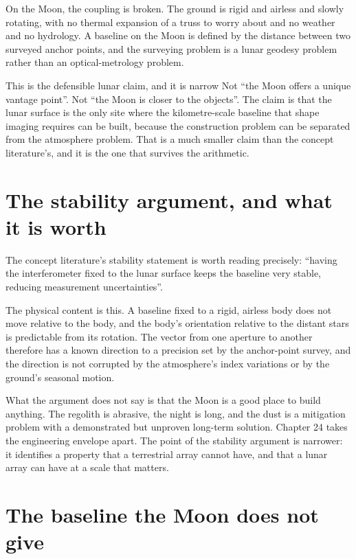 On the Moon, the coupling is broken. The ground is rigid and airless and
slowly rotating, with no thermal expansion of a truss to worry about and no
weather and no hydrology. A baseline on the Moon is defined by the distance
between two surveyed anchor points, and the surveying problem is a lunar
geodesy problem rather than an optical-metrology problem.

\begin{seamnote}{This is the defensible lunar claim, and it is narrow}
Not ``the Moon offers a unique vantage point''. Not ``the Moon is closer to
the objects''. The claim is that the lunar surface is the only site where
the kilometre-scale baseline that shape imaging requires can be built,
because the construction problem can be separated from the atmosphere
problem. That is a much smaller claim than the concept literature's, and it
is the one that survives the arithmetic.
\end{seamnote}

\section{The stability argument, and what it is worth}

The concept literature's stability statement is worth reading precisely:
``having the interferometer fixed to the lunar surface keeps the baseline
very stable, reducing measurement uncertainties''.

The physical content is this. A baseline fixed to a rigid, airless body
does not move relative to the body, and the body's orientation relative to
the distant stars is predictable from its rotation. The vector from one
aperture to another therefore has a known direction to a precision set by
the anchor-point survey, and the direction is not corrupted by the
atmosphere's index variations or by the ground's seasonal motion.

What the argument does not say is that the Moon is a good place to build
anything. The regolith is abrasive, the night is long, and the dust is a
mitigation problem with a demonstrated but unproven long-term solution.
Chapter 24 takes the engineering envelope apart. The point of the stability
argument is narrower: it identifies a property that a terrestrial array
cannot have, and that a lunar array can have at a scale that matters.

\section{The baseline the Moon does not give}

